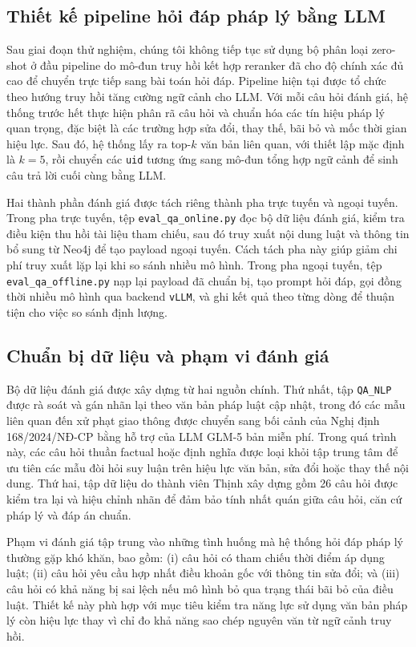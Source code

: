 \subsection{Thiết kế pipeline hỏi đáp pháp lý bằng LLM}
Sau giai đoạn thử nghiệm, chúng tôi không tiếp tục sử dụng bộ phân loại zero-shot ở đầu pipeline do mô-đun truy hồi kết hợp reranker đã cho độ chính xác đủ cao để chuyển trực tiếp sang bài toán hỏi đáp. Pipeline hiện tại được tổ chức theo hướng truy hồi tăng cường ngữ cảnh cho LLM. Với mỗi câu hỏi đánh giá, hệ thống trước hết thực hiện phân rã câu hỏi và chuẩn hóa các tín hiệu pháp lý quan trọng, đặc biệt là các trường hợp sửa đổi, thay thế, bãi bỏ và mốc thời gian hiệu lực. Sau đó, hệ thống lấy ra top-$k$ văn bản liên quan, với thiết lập mặc định là $k=5$, rồi chuyển các \texttt{uid} tương ứng sang mô-đun tổng hợp ngữ cảnh để sinh câu trả lời cuối cùng bằng LLM.

Hai thành phần đánh giá được tách riêng thành pha trực tuyến và ngoại tuyến. Trong pha trực tuyến, tệp \texttt{eval\_qa\_online.py} đọc bộ dữ liệu đánh giá, kiểm tra điều kiện thu hồi tài liệu tham chiếu, sau đó truy xuất nội dung luật và thông tin bổ sung từ Neo4j để tạo payload ngoại tuyến. Cách tách pha này giúp giảm chi phí truy xuất lặp lại khi so sánh nhiều mô hình. Trong pha ngoại tuyến, tệp \texttt{eval\_qa\_offline.py} nạp lại payload đã chuẩn bị, tạo prompt hỏi đáp, gọi đồng thời nhiều mô hình qua backend \texttt{vLLM}, và ghi kết quả theo từng dòng để thuận tiện cho việc so sánh định lượng.

\subsection{Chuẩn bị dữ liệu và phạm vi đánh giá}
Bộ dữ liệu đánh giá được xây dựng từ hai nguồn chính. Thứ nhất, tập \texttt{QA\_NLP} được rà soát và gán nhãn lại theo văn bản pháp luật cập nhật, trong đó các mẫu liên quan đến xử phạt giao thông được chuyển sang bối cảnh của Nghị định 168/2024/NĐ-CP bằng hỗ trợ của LLM GLM-5 bản miễn phí. Trong quá trình này, các câu hỏi thuần factual hoặc định nghĩa được loại khỏi tập trung tâm để ưu tiên các mẫu đòi hỏi suy luận trên hiệu lực văn bản, sửa đổi hoặc thay thế nội dung. Thứ hai, tập dữ liệu do thành viên Thịnh xây dựng gồm 26 câu hỏi được kiểm tra lại và hiệu chỉnh nhãn để đảm bảo tính nhất quán giữa câu hỏi, căn cứ pháp lý và đáp án chuẩn.

Phạm vi đánh giá tập trung vào những tình huống mà hệ thống hỏi đáp pháp lý thường gặp khó khăn, bao gồm: (i) câu hỏi có tham chiếu thời điểm áp dụng luật; (ii) câu hỏi yêu cầu hợp nhất điều khoản gốc với thông tin sửa đổi; và (iii) câu hỏi có khả năng bị sai lệch nếu mô hình bỏ qua trạng thái bãi bỏ của điều luật. Thiết kế này phù hợp với mục tiêu kiểm tra năng lực sử dụng văn bản pháp lý còn hiệu lực thay vì chỉ đo khả năng sao chép nguyên văn từ ngữ cảnh truy hồi.

